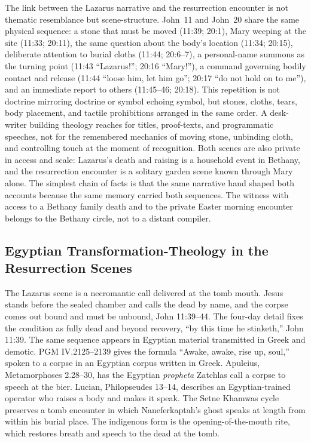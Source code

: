 The link between the Lazarus narrative and the resurrection encounter is not thematic resemblance but scene-structure.
John~11 and John~20 share the same physical sequence: a stone that must be moved (11:39; 20:1), Mary weeping at the site (11:33; 20:11), the same question about the body's location (11:34; 20:15), deliberate attention to burial cloths (11:44; 20:6--7), a personal-name summons as the turning point (11:43 ``Lazarus!''; 20:16 ``Mary!''), a command governing bodily contact and release (11:44 ``loose him, let him go''; 20:17 ``do not hold on to me''), and an immediate report to others (11:45--46; 20:18).
This repetition is not doctrine mirroring doctrine or symbol echoing symbol, but stones, cloths, tears, body placement, and tactile prohibitions arranged in the same order.
A desk-writer building theology reaches for titles, proof-texts, and programmatic speeches, not for the remembered mechanics of moving stone, unbinding cloth, and controlling touch at the moment of recognition.
Both scenes are also private in access and scale: Lazarus's death and raising is a household event in Bethany, and the resurrection encounter is a solitary garden scene known through Mary alone.
The simplest chain of facts is that the same narrative hand shaped both accounts because the same memory carried both sequences.
The witness with access to a Bethany family death and to the private Easter morning encounter belongs to the Bethany circle, not to a distant compiler.

\subsection{Egyptian Transformation-Theology in the Resurrection Scenes}\label{subsec:egyptian-transformation-theology}

The Lazarus scene is a necromantic call delivered at the tomb mouth.
Jesus stands before the sealed chamber and calls the dead by name, and the corpse comes out bound and must be unbound, John 11:39--44.
The four-day detail fixes the condition as fully dead and beyond recovery, ``by this time he stinketh,'' John 11:39.
The same sequence appears in Egyptian material transmitted in Greek and demotic.
PGM IV.2125--2139 gives the formula ``Awake, awake, rise up, soul,'' spoken to a corpse in an Egyptian corpus written in Greek.
Apuleius, Metamorphoses 2.28--30, has the Egyptian \emph{propheta} Zatchlas call a corpse to speech at the bier.
Lucian, Philopseudes 13--14, describes an Egyptian-trained operator who raises a body and makes it speak.
The Setne Khamwas cycle preserves a tomb encounter in which Naneferkaptah's ghost speaks at length from within his burial place.
The indigenous form is the opening-of-the-mouth rite, which restores breath and speech to the dead at the tomb.

